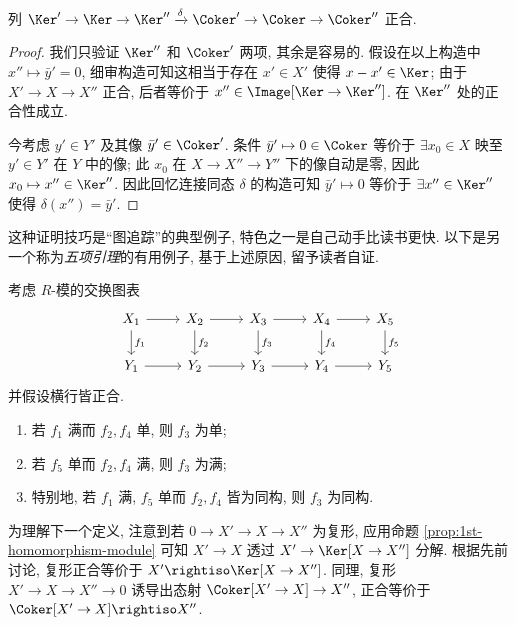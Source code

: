 \begin{proposition}\label{prop:snake-lemma-mod}
	列 $\Ker' \to \Ker \to \Ker'' \xrightarrow{\delta} \Coker' \to \Coker \to \Coker''$ 正合.
\end{proposition}
\begin{proof}
	我们只验证 $\Ker''$ 和 $\Coker'$ 两项, 其余是容易的. 假设在以上构造中 $x'' \mapsto \bar{y}' = 0$, 细审构造可知这相当于存在 $x' \in X'$ 使得 $x-x' \in \Ker$; 由于 $X' \to X \to X''$ 正合, 后者等价于 $x'' \in \Image[\Ker \to \Ker'']$. 在 $\Ker''$ 处的正合性成立.

	今考虑 $y' \in Y'$ 及其像 $\bar{y}' \in \Coker'$. 条件 $\bar{y}' \mapsto 0 \in \Coker$ 等价于 $\exists x_0 \in X$ 映至 $y' \in Y'$ 在 $Y$ 中的像; 此 $x_0$ 在 $X \to X'' \to Y''$ 下的像自动是零, 因此 $x_0 \mapsto x'' \in \Ker''$. 因此回忆连接同态 $\delta$ 的构造可知 $\bar{y}' \mapsto 0$ 等价于 $\exists x'' \in \Ker''$ 使得 $\delta(x'') = \bar{y}'$.
\end{proof}
这种证明技巧是``图追踪''的典型例子, 特色之一是自己动手比读书更快. 以下是另一个称为\emph{五项引理}的有用例子, 基于上述原因, 留予读者自证.

\begin{proposition}\label{prop:5-lemma-mod}
	考虑 $R$-模的交换图表
	\[\begin{tikzcd}
		X_1 \arrow[r] \arrow[d, "f_1"] & X_2 \arrow[r] \arrow[d, "f_2"] & X_3 \arrow[r] \arrow[d, "f_3"] & X_4 \arrow[r] \arrow[d, "f_4"] & X_5 \arrow[d, "f_5"] \\
		Y_1 \arrow[r] & Y_2 \arrow[r] & Y_3 \arrow[r] & Y_4 \arrow[r] & Y_5
	\end{tikzcd}\]
	并假设横行皆正合.
	\begin{enumerate}
		\item 若 $f_1$ 满而 $f_2, f_4$ 单, 则 $f_3$ 为单;
		\item 若 $f_5$ 单而 $f_2, f_4$ 满, 则 $f_3$ 为满;
		\item 特别地, 若 $f_1$ 满, $f_5$ 单而 $f_2, f_4$ 皆为同构, 则 $f_3$ 为同构.
	\end{enumerate}
\end{proposition}

为理解下一个定义, 注意到若 $0 \to X' \to X \to X''$ 为复形, 应用命题 \ref{prop:1st-homomorphism-module} 可知 $X' \to X$ 透过 $X' \to \Ker[X \to X'']$ 分解. 根据先前讨论, 复形正合等价于 $X' \rightiso \Ker[X \to X'']$. 同理, 复形 $X' \to X \to X'' \to 0$ 诱导出态射 $\Coker[X' \to X] \to X''$, 正合等价于 $\Coker[X' \to X] \rightiso X''$.

